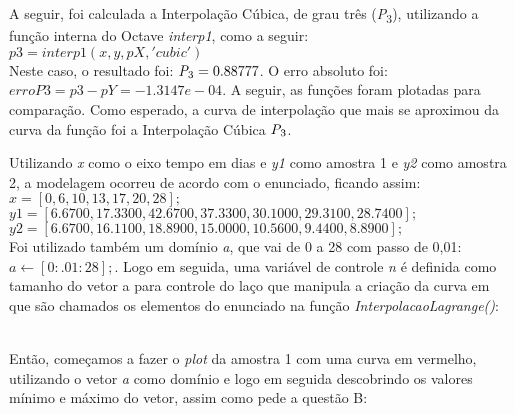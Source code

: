 \documentclass[12pt]{article}
\newenvironment{question}[2][Questão]{\begin{trivlist}
\item[\hskip \labelsep {\bfseries #1}\hskip \labelsep {\bfseries #2.}]}{\end{trivlist}}
\begin{document}
\begin{question}{1}
	A seguir, foi calculada a Interpolação Cúbica, de grau três (\textit{P}\textsubscript{3}), utilizando a função interna do Octave \textit{interp1}, como a seguir: \\
	
	$p3 = interp1(x, y, pX, 'cubic')$ \\
	
	Neste caso, o resultado foi: $\textit{P}\textsubscript{3} = 0.88777$. O erro absoluto foi: $erroP3 = p3 - pY = -1.3147e-04$. A seguir, as funções foram plotadas para comparação. Como esperado, a curva de interpolação que mais se aproximou da curva da função foi a Interpolação Cúbica $\textit{P}\textsubscript{3}$.

\end{question}

\newpage
\begin{question}{2}
	Utilizando \textit{x} como o eixo tempo em dias e \textit{y1} como amostra 1 e \textit{y2} como amostra 2, a modelagem ocorreu de acordo com o enunciado, ficando assim:\\
	$x = [0,6,10,13,17,20,28];$\\
	$y1 = [6.6700,17.3300,42.6700,37.3300,30.1000,29.3100,28.7400];$\\
	$y2 = [6.6700,16.1100,18.8900,15.0000,10.5600,9.4400,8.8900];$\\

	Foi utilizado também um domínio \textit{a}, que vai de 0 a 28 com passo de 0,01: $a \gets [0:.01:28];$. Logo em seguida, uma variável de controle \textit{n} é definida como tamanho do vetor a para controle do laço que manipula a criação da curva em que são chamados os elementos do enunciado na função \textit{InterpolacaoLagrange()}:\\
	\begin{algorithm}
		\begin{algorithmic}[1]
			 
			\EndFor
		\end{algorithmic}
	\end{algorithm}\\

	Então, começamos a fazer o \textit{plot} da amostra 1 com uma curva em vermelho, utilizando o vetor \textit{a} como domínio e logo em seguida descobrindo os valores mínimo e máximo do vetor, assim como pede a questão B:\\
	
	\begin{algorithm}
		\begin{algorithmic}[1]
		\end{algorithmic}
	\end{algorithm}


\end{question}
\end{document}
